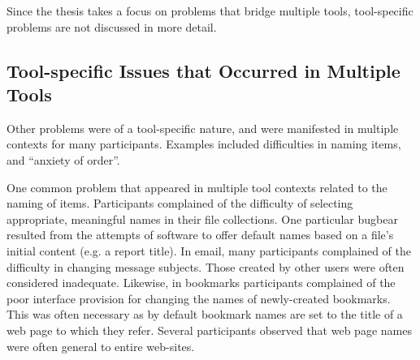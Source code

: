 Since the thesis takes a focus on problems that bridge multiple tools, tool-specific problems are not discussed in more detail.


\subsection{Tool-specific Issues that Occurred in Multiple Tools}
\label{exp-study:issues-repeated}

Other problems were of a tool-specific nature, and were manifested in multiple contexts for many participants.  Examples included difficulties in naming items, and ``anxiety of order''.

One common problem that appeared in multiple tool contexts related to the naming of items.  Participants complained of the difficulty of selecting appropriate, meaningful names in their file collections.  One particular bugbear resulted from the attempts of software to offer default names based on a file's initial content (e.g. a report title).  In email, many participants complained of the difficulty in changing message subjects.  Those created by other users were often considered inadequate.  Likewise, in bookmarks participants complained of the poor interface provision for changing the names of newly-created bookmarks.  This was often necessary as by default bookmark names are set to the title of a web page to which they refer.  Several participants observed that web page names were often general to entire web-sites.

